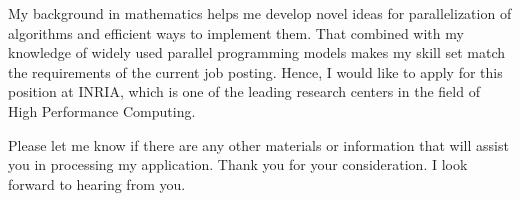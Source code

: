 \documentclass[10pt,stdletter,dateno]{newlfm}
\begin{document}
\begin{newlfm}
\par
	   My background in mathematics helps me develop novel ideas for parallelization of algorithms and efficient ways to implement them. 
	   That combined with my knowledge of widely used parallel programming models makes my skill set match the requirements of the current job posting.
	   Hence, I would like to apply for this position at INRIA, which is one of the leading research centers in the field of High Performance Computing. 
%
\par
Please let me know if there are any other materials or information that will assist you in processing my application. 
Thank you for your consideration. I look forward to hearing from you.
%
%
\end{newlfm}
\end{document}
